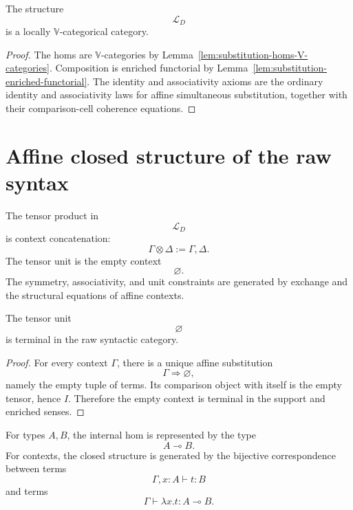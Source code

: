 \begin{proposition}
\label{prop:raw-syntactic-category}
The structure
\[
    \mathcal L_D
\]
is a locally \(\mathbb V\)-categorical category.
\end{proposition}

\begin{proof}
The homs are \(\mathbb V\)-categories by
Lemma~\ref{lem:substitution-homs-V-categories}.  Composition is enriched
functorial by Lemma~\ref{lem:substitution-enriched-functorial}.  The identity
and associativity axioms are the ordinary identity and associativity laws for
affine simultaneous substitution, together with their comparison-cell
coherence equations.
\end{proof}

\section{Affine closed structure of the raw syntax}
\label{sec:affine-closed-structure-raw-syntax}

\begin{definition}
\label{def:tensor-unit-raw-syntax}
The tensor product in
\[
    \mathcal L_D
\]
is context concatenation:
\[
    \Gamma\otimes\Delta
    :=
    \Gamma,\Delta.
\]
The tensor unit is the empty context
\[
    \varnothing.
\]
The symmetry, associativity, and unit constraints are generated by exchange
and the structural equations of affine contexts.
\end{definition}

\begin{lemma}
\label{lem:affinity-raw-syntax}
The tensor unit
\[
    \varnothing
\]
is terminal in the raw syntactic category.
\end{lemma}

\begin{proof}
For every context \(\Gamma\), there is a unique affine substitution
\[
    \Gamma\Rightarrow\varnothing,
\]
namely the empty tuple of terms.  Its comparison object with itself is the
empty tensor, hence \(I\).  Therefore the empty context is terminal in the
support and enriched senses.
\end{proof}

\begin{definition}
\label{def:internal-hom-raw-syntax}
For types \(A,B\), the internal hom is represented by the type
\[
    A\multimap B.
\]
For contexts, the closed structure is generated by the bijective
correspondence between terms
\[
    \Gamma,x:A\vdash t:B
\]
and terms
\[
    \Gamma\vdash \lambda x.t:A\multimap B.
\]
\end{definition}

